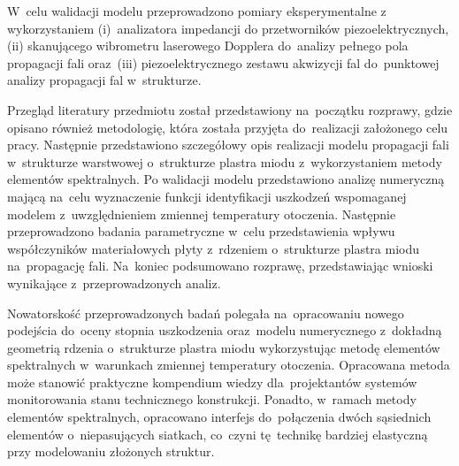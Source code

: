 {W~celu walidacji modelu przeprowadzono pomiary eksperymentalne z wykorzy\-staniem (i)~analizatora impedancji do przetworników piezoelektry\-cznych, (ii) skanują\-cego wibrometru laserowego Dopplera do~analizy pełnego pola propagacji fali oraz~(iii) piezoelektrycznego zestawu akwizycji fal do~punktowej analizy pro\-pagacji fal w~stru\-kturze.

Przegląd literatury przedmiotu został przedstawiony na~początku rozprawy, gdzie opisano również metodologię, która została przyjęta do~realizacji założonego celu pracy. Następnie przedstawiono szczegółowy opis realizacji modelu propagacji fali w~strukturze warstwowej o~strukturze plastra miodu z~wykorzystaniem metody elementów spektralnych.
Po walidacji modelu przedstawiono analizę numeryczną mającą na~celu wyznaczenie funkcji identyfikacji uszkodzeń wspomaganej modelem z~uwzglę\-dnieniem zmiennej temperatury otoczenia. Następnie przeprowadzono badania parametryczne w~celu przedstawienia wpływu współczyników materiałowych płyty z~rdzeniem o~strukturze plastra miodu na~propagację fali. Na~koniec podsumowano rozprawę, przedstawiając wnioski wynikające z~przeprowadzonych analiz. 

Nowatorskość przeprowadzonych badań polegała na~opracowaniu nowego podejścia do~oceny stopnia uszkodzenia oraz~modelu numerycznego z~dokładną geo\-metrią rdzenia o~strukturze plastra miodu wykorzystując metodę elementów spe\-ktralnych w~warunkach zmiennej temperatury otoczenia. Opracowana metoda może stanowić praktyczne kompendium wiedzy dla~projektantów systemów monitorowania stanu technicznego konstrukcji. Ponadto, w~ramach metody elementów spektralnych, opracowano interfejs do~po\-łączenia dwóch sąsiednich elementów o~niepasujących siatkach, co~czyni tę~technikę bardziej elastyczną przy modelowaniu złożonych struktur.
}

\newcommand{\acknowledgement}
{
}

\newcommand{\engineeringquote}
{
\null\vfill
\begin{quote}
"When you want to know how things really work, \\  \hspace*{2cm} study them when they’re coming apart."\begin{flushright}- William Gibson 
\end{flushright}
\end{quote}
\vfill
}

\renewcommand{\bibname}{Bibliography}
\setlength{}

